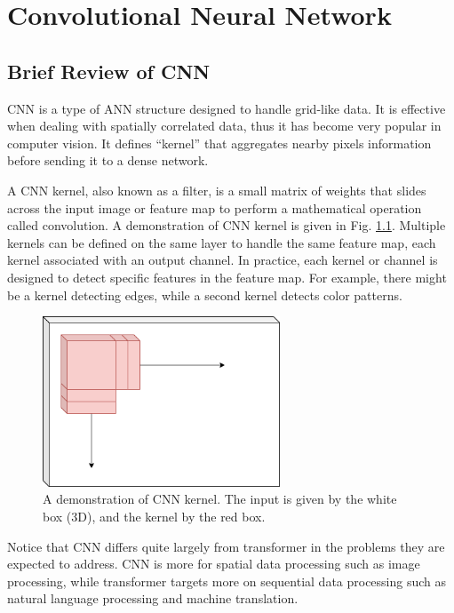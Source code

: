 \chapter{Convolutional Neural Network}

\section{Brief Review of CNN}

CNN is a type of ANN structure designed to handle grid-like data. It is effective when dealing with spatially correlated data, thus it has become very popular in computer vision. It defines ``kernel'' that aggregates nearby pixels information before sending it to a dense network.

A CNN kernel, also known as a filter, is a small matrix of weights that slides across the input image or feature map to perform a mathematical operation called convolution. A demonstration of CNN kernel is given in Fig. \ref{ch:cnn:fig:cnn_kernel}. Multiple kernels can be defined on the same layer to handle the same feature map, each kernel associated with an output channel. In practice, each kernel or channel is designed to detect specific features in the feature map. For example, there might be a kernel detecting edges, while a second kernel detects color patterns.

\begin{figure}
	\centering
	\includegraphics[width=200pt]{chapters/part-3/figures/cnn_general.png}
	\caption{A demonstration of CNN kernel. The input is given by the white box (3D), and the kernel by the red box.} \label{ch:cnn:fig:cnn_kernel}
\end{figure}

Notice that CNN differs quite largely from transformer in the problems they are expected to address. CNN is more for spatial data processing such as image processing, while transformer targets more on sequential data processing such as natural language processing and machine translation. 